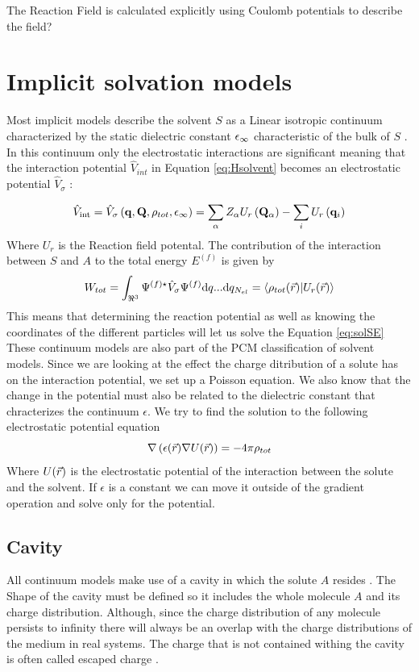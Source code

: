 \documentclass[../master_thesis.tex]{subfiles}
\begin{document}
The Reaction Field is calculated explicitly using Coulomb potentials to describe
the field?

\section{Implicit solvation models}
Most implicit models describe the solvent $S$ as a Linear isotropic continuum
characterized by the static dielectric constant $\epsilon_{\infty}$ characteristic
of the bulk of $S$ \cite{Tomasi:1994wt, FossoTande:2013ka}. In this continuum
only the electrostatic interactions are significant \cite{Tomasi:1994wt} meaning
that the interaction potential $\hat{V}_{int}$ in Equation \ref{eq:Hsolvent}
becomes an electrostatic potential $\hat{V}_{\sigma}$ \cite{Tomasi:1994wt}:

\begin{equation}
  \hat{V}_{\mathrm{int}}=\hat{V}_{\sigma}\left(\mathbf{q}, \mathbf{Q},
  \rho_{tot}, \epsilon_{\infty}\right)=\sum_{\alpha} Z_{\alpha} U_r
  \left(\mathbf{Q}_{\alpha}\right)-\sum_{i} U_r\left(\mathbf{q}_{i}\right)
\end{equation}
Where $U_r$ is the Reaction field potental.
The contribution of the interaction between $S$ and $A$ to the total energy
$E^{(f)}$ is given by
\begin{equation}
  W_{tot} = \int_{\real^3}\Psi^{(f)\star}\hat{V}_{\sigma}\Psi^{(f)}\text{d}q...\text{d}q_{N_{el}}
  = \braket{\rho_{tot}(\rvec)|U_r(\rvec)}
\end{equation}
This means that determining the reaction potential as well as knowing the coordinates
of the different particles will let us solve the Equation \ref{eq:solSE}
These continuum models are also part of the \ac{PCM} classification of solvent
models.
Since we are looking at the effect the charge ditribution of a solute has on
the interaction potential, we set up a Poisson equation. We also know that the change in
the potential must also be related to the dielectric constant that chracterizes
the continuum $\epsilon$. We try to find the solution to the following
electrostatic potential equation
\begin{equation}
  \nabla\left( \epsilon(\vec{r}) \nabla U(\vec{r})\right) = -4\pi\rho_{tot}
\end{equation}
Where $U(\vec{r})$ is the electrostatic potential of the interaction between
the solute and the solvent. If $\epsilon$ is a constant we can move it outside
of the gradient operation and solve only for the potential.

\subsection{Cavity}\label{Cavitytitle}
All continuum models make use of a cavity in which the solute $A$ resides
\cite{Tomasi:1994wt, Cramer:2004, Tomasi:2005ipa}. The Shape of the cavity
must be defined so it includes the whole molecule $A$ and its charge distribution.
Although, since the charge distribution of any molecule persists to infinity there
will always be an overlap with the charge distributions of the medium in real
systems. The charge that is not contained withing the cavity is often called
escaped charge \cite{Tomasi:2005ipa}.
\end{document}

